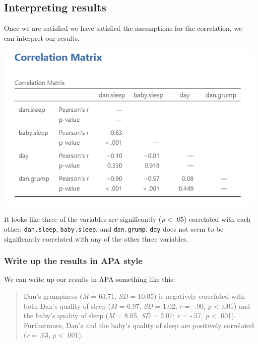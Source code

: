 \documentclass[
]{book}
\begin{document}
\hypertarget{interpreting-results-2}{%
\subsection{Interpreting results}\label{interpreting-results-2}}

Once we are satisfied we have satisfied the assumptions for the correlation, we can interpret our results.

\includegraphics{images/08-correlation/correlation-matrix.png}

It looks like three of the variables are significantly (\emph{p} \textless{} .05) correlated with each other: \texttt{dan.sleep}, \texttt{baby.sleep}, and \texttt{dan.grump}. \texttt{day} does not seem to be significantly correlated with any of the other three variables.

\hypertarget{write-up-the-results-in-apa-style-8}{%
\subsubsection{Write up the results in APA style}\label{write-up-the-results-in-apa-style-8}}

We can write up our results in APA something like this:

\begin{quote}
Dan's grumpiness (\emph{M} = 63.71, \emph{SD} = 10.05) is negatively correlated with both Dan's quality of sleep (\emph{M} = 6.97, \emph{SD} = 1.02; \emph{r} = -.90, \emph{p} \textless{} .001) and the baby's quality of sleep (\emph{M} = 8.05, \emph{SD} = 2.07; \emph{r} = -.57, \emph{p} \textless{} .001). Furthermore, Dan's and the baby's quality of sleep are positively correlated (\emph{r} = .63, \emph{p} \textless{} .001).
\end{quote}
\end{document}
